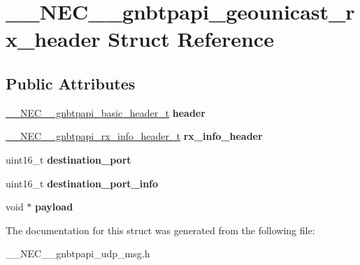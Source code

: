 \hypertarget{struct____NEC____gnbtpapi__geounicast__rx__header}{\section{\-\_\-\-\_\-\-N\-E\-C\-\_\-\-\_\-gnbtpapi\-\_\-geounicast\-\_\-rx\-\_\-header \-Struct \-Reference}
\label{struct____NEC____gnbtpapi__geounicast__rx__header}
}
\subsection*{\-Public \-Attributes}
\begin{DoxyCompactItemize}
\item 
\hypertarget{struct____NEC____gnbtpapi__geounicast__rx__header_a047e76e5fbba92f952111a4a10d2c6d5}{\hyperlink{struct____NEC____gnbtpapi__basic__header}{\-\_\-\-\_\-\-N\-E\-C\-\_\-\-\_\-gnbtpapi\-\_\-basic\-\_\-header\-\_\-t} {\bfseries header}}\label{struct____NEC____gnbtpapi__geounicast__rx__header_a047e76e5fbba92f952111a4a10d2c6d5}

\item 
\hypertarget{struct____NEC____gnbtpapi__geounicast__rx__header_ab78ed0e4450a0196dc0f98aa3ac247a9}{\hyperlink{struct____NEC____gnbtpapi__rx__info__header}{\-\_\-\-\_\-\-N\-E\-C\-\_\-\-\_\-gnbtpapi\-\_\-rx\-\_\-info\-\_\-header\-\_\-t} {\bfseries rx\-\_\-info\-\_\-header}}\label{struct____NEC____gnbtpapi__geounicast__rx__header_ab78ed0e4450a0196dc0f98aa3ac247a9}

\item 
\hypertarget{struct____NEC____gnbtpapi__geounicast__rx__header_add0da3a1c5aeeb7a65a134de23714bab}{uint16\-\_\-t {\bfseries destination\-\_\-port}}\label{struct____NEC____gnbtpapi__geounicast__rx__header_add0da3a1c5aeeb7a65a134de23714bab}

\item 
\hypertarget{struct____NEC____gnbtpapi__geounicast__rx__header_a1f97c3d67c02d67d17cd8b765b6cff9f}{uint16\-\_\-t {\bfseries destination\-\_\-port\-\_\-info}}\label{struct____NEC____gnbtpapi__geounicast__rx__header_a1f97c3d67c02d67d17cd8b765b6cff9f}

\item 
\hypertarget{struct____NEC____gnbtpapi__geounicast__rx__header_a3e6d720d25b6d0d7a812b18a1eefdedf}{void $\ast$ {\bfseries payload}}\label{struct____NEC____gnbtpapi__geounicast__rx__header_a3e6d720d25b6d0d7a812b18a1eefdedf}

\end{DoxyCompactItemize}


\-The documentation for this struct was generated from the following file\-:\begin{DoxyCompactItemize}
\item 
\-\_\-\-\_\-\-N\-E\-C\-\_\-\-\_\-gnbtpapi\-\_\-udp\-\_\-msg.\-h\end{DoxyCompactItemize}
